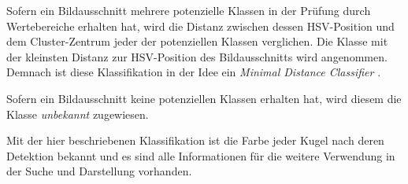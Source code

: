 Sofern ein Bildausschnitt mehrere potenzielle Klassen in der Prüfung durch Wertebereiche erhalten hat, wird die Distanz
zwischen dessen HSV-Position und dem Cluster-Zentrum jeder der potenziellen Klassen verglichen.
Die Klasse mit der kleinsten Distanz zur HSV-Position des Bildausschnitts wird angenommen.
Demnach ist diese Klassifikation in der Idee ein \emph{Minimal Distance Classifier} \cite{seos:minimum_distance_classifier}.

Sofern ein Bildausschnitt keine potenziellen Klassen erhalten hat, wird diesem die Klasse \emph{unbekannt} zugewiesen.

Mit der hier beschriebenen Klassifikation ist die Farbe jeder Kugel nach deren Detektion bekannt und es
sind alle Informationen für die weitere Verwendung in der Suche und Darstellung vorhanden.
